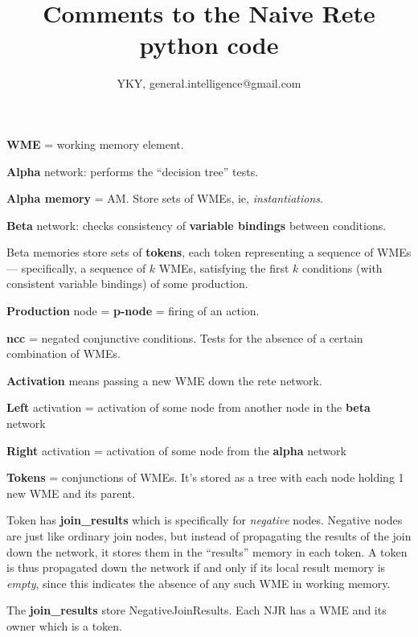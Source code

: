 

\usepackage[CJKspace]{xeCJK}
\usepackage{color}

\usepackage{mathtools}
\usepackage{hyperref}

\title{Comments to the Naive Rete python code}
\author{YKY, general.intelligence@gmail.com}


\maketitle

\textbf{WME} = working memory element.

\textbf{Alpha} network: performs the ``decision tree'' tests.

\textbf{Alpha memory} = AM.  Store sets of WMEs, ie, \textit{instantiations}.

\textbf{Beta} network: checks consistency of \textbf{variable bindings} between conditions.

Beta memories store sets of \textbf{tokens}, each token representing a sequence of WMEs --- specifically, a sequence of $k$ WMEs, satisfying the first $k$ conditions (with consistent variable bindings) of some production.

\textbf{Production} node = \textbf{p-node} = firing of an action.

\textbf{ncc} = negated conjunctive conditions.  Tests for the absence of a certain combination of WMEs.

\textbf{Activation} means passing a new WME down the rete network.

\textbf{Left} activation = activation of some node from another node in the \textbf{beta} network

\textbf{Right} activation = activation of some node from the \textbf{alpha} network

\textbf{Tokens} = conjunctions of WMEs.  It's stored as a tree with each node holding 1 new WME and its parent.

Token has \textbf{join\_results} which is specifically for \textit{negative} nodes.  Negative nodes are just like ordinary join nodes, but instead of propagating the results of the join down the network, it stores them in the ``results'' memory in each token.  A token is thus propagated down the network if and only if its local result memory is \textit{empty}, since this indicates the absence of any such WME in working memory.

The \textbf{join\_results} store NegativeJoinResults.  Each NJR has a WME and its owner which is a token.

